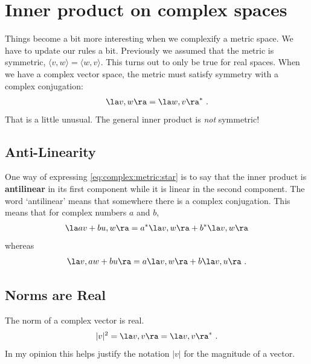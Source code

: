\section{Inner product on complex spaces}

Things become a bit more interesting when we complexify a metric space. We have to update our rules a bit. Previously we assumed that the metric is symmetric, $\langle v, w\rangle = \langle w, v\rangle$. This turns out to only be true for real spaces. When we have a complex vector space, the metric must satisfy symmetry with a complex conjugation:
\begin{align}
    \la v, w \ra = \la w, v \ra^* \ .
    \label{eq:complex:metric:star}
\end{align}
That is a little unusual. The general inner product is \emph{not} symmetric!

\subsection{Anti-Linearity}

One way of expressing \eqref{eq:complex:metric:star} is to say that the inner product is \textbf{antilinear} in its first component while it is linear in the second component. The word `antilinear' means that somewhere there is a complex conjugation. This means that for complex numbers $a$ and $b$,
\begin{align}
    \la av + bu, w \ra = 
    a^* \la v, w\ra
    +
    b^* \la v, w\ra
\end{align}
whereas 
\begin{align}
    \la v, aw + bu \ra = 
    a \la v, w\ra
    +
    b \la v, u\ra \ .
\end{align}


\subsection{Norms are Real}
The norm of a complex vector is real. 
\begin{align}
    |v|^2 = \la v, v \ra = \la v, v \ra^* \ .
\end{align}
In my opinion this helps justify the notation $|v|$ for the magnitude of a vector.


